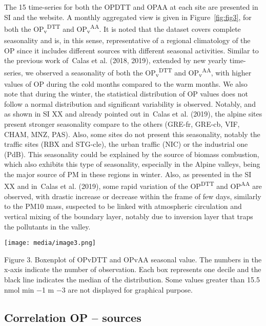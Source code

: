 \documentclass[
]{article}
\begin{document}
The 15 time-series for both the OPDTT and OPAA at each site are
presented in SI and the website. A monthly aggregated view is given in
Figure~\protect\hyperlink{fig:fig3}{{[}fig:fig3{]}}, for both the
OP\textsubscript{v}\textsuperscript{DTT} and
OP\textsubscript{v}\textsuperscript{AA}. It is noted that the dataset
covers complete seasonality and is, in this sense, representative of a
regional climatology of the OP since it includes different sources with
different seasonal activities. Similar to the previous work of~Calas et
al. (2018, 2019), extended by new yearly time-series, we observed a
seasonality of both the OP\textsubscript{v}\textsuperscript{DTT} and
OP\textsubscript{v}\textsuperscript{AA}, with higher values of OP during
the cold months compared to the warm months. We also note that during
the winter, the statistical distribution of OP values does not follow a
normal distribution and significant variability is observed. Notably,
and as shown in SI XX and already pointed out in~Calas et al. (2019),
the alpine sites present stronger seasonality compare to the others
(GRE-fr, GRE-cb, VIF, CHAM, MNZ, PAS). Also, some sites do not present
this seasonality, notably the traffic sites (RBX and STG-cle), the urban
traffic (NIC) or the industrial one (PdB). This seasonality could be
explained by the source of biomass combustion, which also exhibits this
type of seasonality, especially in the Alpine valleys, being the major
source of PM in these regions in winter. Also, as presented in the SI XX
and in~Calas et al. (2019), some rapid variation of the
OP\textsuperscript{DTT} and OP\textsuperscript{AA} are observed, with
drastic increase or decrease within the frame of few days, similarly to
the PM10 mass, suspected to be linked with atmospheric circulation and
vertical mixing of the boundary layer, notably due to inversion layer
that traps the pollutants in the valley.

\texttt{[image: media/image3.png]}

Figure 3. Boxenplot of OPvDTT and OPvAA seasonal value. The numbers in
the x-axis indicate the number of observation. Each box represents one
decile and the black line indicates the median of the distribution. Some
values greater than 15.5 nmol min −1 m −3 are not displayed for
graphical purpose.

\hypertarget{correlation-op-sources}{%
\subsection{Correlation OP -- sources}\label{correlation-op-sources}}
\end{document}
